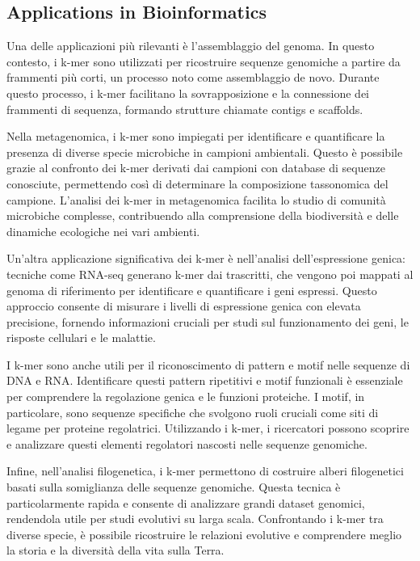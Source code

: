 	\subsection{Applications in Bioinformatics}
	\label{subsec:kmer-applications}
	
	Una delle applicazioni più rilevanti è l'assemblaggio del genoma. In questo contesto, i k-mer sono utilizzati per ricostruire sequenze genomiche a partire da frammenti più corti, un processo noto come assemblaggio de novo. Durante questo processo, i k-mer facilitano la sovrapposizione e la connessione dei frammenti di sequenza, formando strutture chiamate contigs e scaffolds.
	
	Nella metagenomica, i k-mer sono impiegati per identificare e quantificare la presenza di diverse specie microbiche in campioni ambientali. Questo è possibile grazie al confronto dei k-mer derivati dai campioni con database di sequenze conosciute, permettendo così di determinare la composizione tassonomica del campione. L'analisi dei k-mer in metagenomica facilita lo studio di comunità microbiche complesse, contribuendo alla comprensione della biodiversità e delle dinamiche ecologiche nei vari ambienti.
	
	Un'altra applicazione significativa dei k-mer è nell'analisi dell'espressione genica: tecniche come RNA-seq generano k-mer dai trascritti, che vengono poi mappati al genoma di riferimento per identificare e quantificare i geni espressi. Questo approccio consente di misurare i livelli di espressione genica con elevata precisione, fornendo informazioni cruciali per studi sul funzionamento dei geni, le risposte cellulari e le malattie.
	
	I k-mer sono anche utili per il riconoscimento di pattern e motif nelle sequenze di DNA e RNA. Identificare questi pattern ripetitivi e motif funzionali è essenziale per comprendere la regolazione genica e le funzioni proteiche. I motif, in particolare, sono sequenze specifiche che svolgono ruoli cruciali come siti di legame per proteine regolatrici. Utilizzando i k-mer, i ricercatori possono scoprire e analizzare questi elementi regolatori nascosti nelle sequenze genomiche.
	
	Infine, nell'analisi filogenetica, i k-mer permettono di costruire alberi filogenetici basati sulla somiglianza delle sequenze genomiche. Questa tecnica è particolarmente rapida e consente di analizzare grandi dataset genomici, rendendola utile per studi evolutivi su larga scala. Confrontando i k-mer tra diverse specie, è possibile ricostruire le relazioni evolutive e comprendere meglio la storia e la diversità della vita sulla Terra.
	
